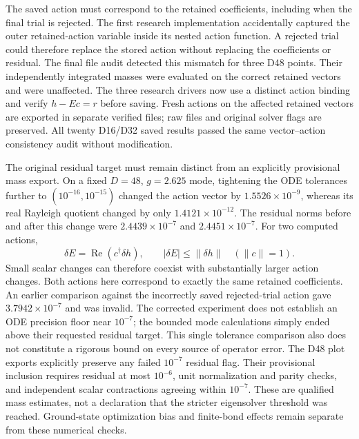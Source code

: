 \documentclass[11pt]{article}
\begin{document}
The saved action must correspond to the retained coefficients, including when
the final trial is rejected. The first research implementation accidentally
captured the outer retained-action variable inside its nested action function.
A rejected trial could therefore replace the stored action without replacing
the coefficients or residual. The final file audit detected this mismatch for
three D48 points. Their independently integrated masses were evaluated on the
correct retained vectors and were unaffected. The three research drivers now
use a distinct action binding and verify $h-Ec=r$ before saving. Fresh actions
on the affected retained vectors are exported in separate verified files; raw
files and original solver flags are preserved. All twenty D16/D32 saved results
passed the same vector--action consistency audit without modification.

The original residual target must remain distinct from an explicitly
provisional mass export. On a fixed $D=48$, $g=2.625$ mode, tightening the
ODE tolerances further to $(10^{-16},10^{-15})$ changed the action vector by
$1.5526\times10^{-9}$, whereas its real Rayleigh quotient changed by only
$1.4121\times10^{-12}$. The residual norms before and after this change were
$2.4439\times10^{-7}$ and $2.4451\times10^{-7}$. For two computed actions,
\begin{equation}
 \delta E=\operatorname{Re}(c^\dagger\delta h),\qquad
 |\delta E|\leq\|\delta h\|\quad(\|c\|=1).
\end{equation}
Small scalar changes can therefore coexist with substantially larger action
changes. Both actions here correspond to exactly the same retained coefficients.
An earlier comparison against the incorrectly saved rejected-trial action gave
$3.7942\times10^{-7}$ and was invalid. The corrected experiment does not establish
an ODE precision floor near $10^{-7}$; the bounded mode calculations simply
ended above their requested residual target. This single tolerance comparison
also does not constitute a rigorous bound on every source of operator error.
The D48 plot exports explicitly preserve any failed $10^{-7}$ residual flag.
Their provisional inclusion requires residual at most $10^{-6}$, unit
normalization and parity checks, and independent scalar contractions agreeing
within $10^{-7}$. These are qualified mass estimates, not a declaration that
the stricter eigensolver threshold was reached. Ground-state optimization
bias and finite-bond effects remain separate from these numerical checks.
\end{document}
